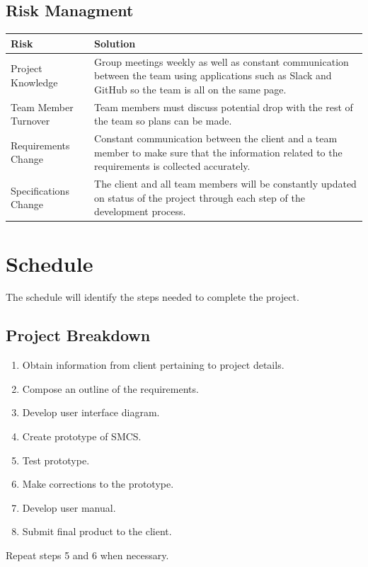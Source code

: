 \documentclass{scrreprt}
\begin{document}
	\section{Risk Managment}
	\begin{tabular}{|p{5cm}|p{9cm}|}
		\hline 
		Risk & Solution \\ 
		\hline 
		Project Knowledge &  Group meetings weekly as well as constant communication between the team using applications such as Slack and GitHub so the team is all on the same page.\\ 
		\hline 
		Team Member Turnover & Team members must discuss potential drop with the rest of the team so plans can be made.\\ 
		\hline 
		Requirements Change & Constant communication between the client and a team member to make sure that the information related to the requirements is collected accurately.\\ 
		\hline 
		Specifications Change & The client and all team members will be constantly updated on status of the project through each step of the development process. \\ 
		\hline 
	\end{tabular} 
	\chapter{Schedule}
	The schedule will identify the steps needed to complete the project.
	\section{Project Breakdown}
	\begin{enumerate}
		\item Obtain information from client pertaining to project details.
		\item Compose an outline of the requirements.
		\item Develop user interface diagram.
		\item Create prototype of SMCS.
		\item Test prototype.
		\item Make corrections to the prototype.
		\item Develop user manual.
		\item Submit final product to the client.
	\end{enumerate}
	Repeat steps 5 and 6 when necessary.
\end{document}
